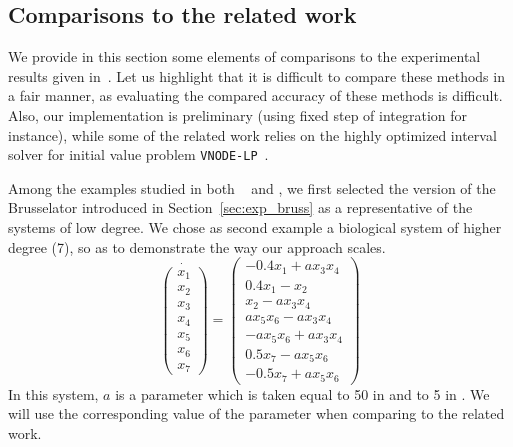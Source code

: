 \documentclass{sig-alternate-05-2015}
\newcommand\ForAuthors[1]%
 {\par\smallskip                     %
  \begin{center}%
   \fbox%
   {\parbox{0.9\linewidth}%
    {\raggedright\sc--- #1}%
   }%
  \end{center}%
  \par\smallskip                     %
 }
\begin{document}
\subsection{Comparisons to the related work}
\label{sec:exp_compar}
We provide in this section some elements of comparisons to the experimental results given in~\cite{Underapproxflowpipes,underapprox16}.
Let us highlight that it is difficult to compare these methods in a fair manner, as evaluating the compared accuracy of these methods is difficult. 
Also, our implementation is preliminary (using fixed step of integration for instance), while some of the related work relies on the highly optimized 
interval solver for initial value problem {\tt VNODE-LP}~\cite{VNODELP}. 


Among the examples studied in both ~\cite{Underapproxflowpipes} and \cite{underapprox16}, we first selected
the version of the Brusselator introduced in Section~\ref{sec:exp_bruss} as a representative of the systems of low degree. 
We chose as second example a biological system of higher degree (7), so as to demonstrate the way our approach scales. 
\begin{equation}
\dot{\left(\begin{array}{c}
x_1 \\
x_2 \\
x_3 \\
x_4 \\
x_5 \\
x_6 \\
x_7
\end{array}\right)} = \left(\begin{array}{c}
-0.4x_1+ a x_3x_4 \\
0.4x_1-x_2 \\
x_2- a x_3x_4 \\
a x_5x_6- a x_3x_4 \\
- a x_5x_6+ a x_3x_4 \\
0.5x_7- a x_5x_6 \\
-0.5x_7+ a x_5x_6
\end{array}\right)
\end{equation}
In this system, $a$ is a parameter which is taken equal to 50 in \cite{Underapproxflowpipes} and to 5 in \cite{underapprox16}. 
We will use the corresponding value of the parameter when comparing to the related work.
\end{document}
